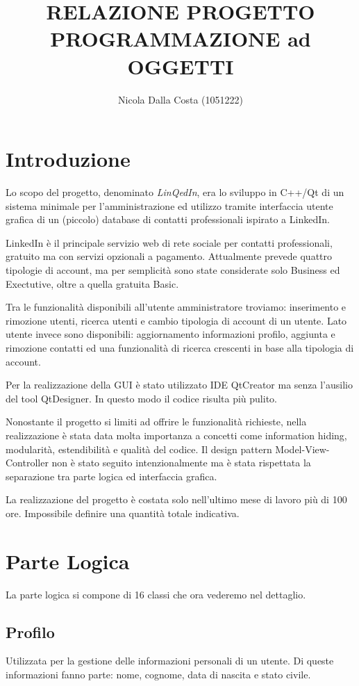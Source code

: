 \documentclass[a4paper,openany]{article}
\title{RELAZIONE PROGETTO\\PROGRAMMAZIONE ad OGGETTI}
\author{Nicola Dalla Costa (1051222)}
\date{}
\begin{document}
\maketitle
\raggedbottom

\section*{Introduzione}
Lo scopo del progetto, denominato \textit{LinQedIn}, era lo sviluppo in C++/Qt di un sistema minimale per l'amministrazione ed utilizzo tramite interfaccia utente grafica di un (piccolo) database di contatti professionali ispirato a LinkedIn. 

LinkedIn è il principale servizio web di rete sociale per contatti professionali, gratuito ma con servizi opzionali a pagamento. Attualmente prevede quattro tipologie di account, ma per semplicità sono state considerate solo Business ed Exectutive, oltre a quella gratuita Basic.

Tra le funzionalità disponibili all'utente amministratore troviamo: inserimento e rimozione utenti, ricerca utenti e cambio tipologia di account di un utente. Lato utente invece sono disponibili: aggiornamento informazioni profilo, aggiunta e rimozione contatti ed una funzionalità di ricerca crescenti in base alla tipologia di account.

Per la realizzazione della GUI è stato utilizzato IDE QtCreator ma senza l'ausilio del tool QtDesigner. In questo modo il codice risulta più pulito.

Nonostante il progetto si limiti ad offrire le funzionalità richieste, nella realizzazione è stata data molta importanza a concetti come information hiding, modularità, estendibilità e qualità del codice. Il design pattern Model-View-Controller non è stato seguito intenzionalmente ma è stata rispettata la separazione tra parte logica ed interfaccia grafica.

La realizzazione del progetto è costata solo nell'ultimo mese di lavoro più di 100 ore. Impossibile definire una quantità totale indicativa.

\section*{Parte Logica}
La parte logica si compone di 16 classi che ora vederemo nel dettaglio.

\subsection*{Profilo}
Utilizzata per la gestione delle informazioni personali di un utente. Di queste informazioni fanno parte: nome, cognome, data di nascita e stato civile. 
\end{document}
